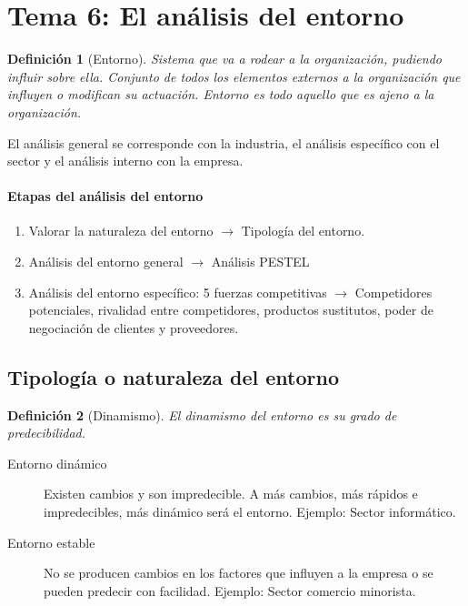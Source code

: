 \documentclass[12pt]{article}
\theoremstyle{definition_wo_parentheses}
\newtheorem{definicion}{Definición}[section]
\begin{document}
\section{Tema 6: El análisis del entorno}

\begin{definicion}[Entorno] 
	Sistema que va a rodear a la organización, pudiendo influir sobre ella. Conjunto de todos los elementos externos a la organización que influyen o modifican su actuación. Entorno es todo aquello que es ajeno a la organización.
\end{definicion}

	El análisis general se corresponde con la industria, el análisis específico con el sector y el análisis interno con la empresa.
	
\paragraph{Etapas del análisis del entorno}
\begin{enumerate}
\item Valorar la naturaleza del entorno $\rightarrow$ Tipología del entorno.
\item Análisis del entorno general $\rightarrow$ Análisis PESTEL
\item Análisis del entorno específico: 5 fuerzas competitivas $\rightarrow$ Competidores potenciales, rivalidad entre competidores, productos sustitutos, poder de negociación de clientes y proveedores.
\end{enumerate}

\subsection{Tipología  o naturaleza del entorno}

\begin{definicion}[Dinamismo]
El dinamismo del entorno es su grado de predecibilidad.
\end{definicion}

\begin{description}
\item[Entorno dinámico] Existen cambios y son impredecible. A más cambios, más rápidos e impredecibles, más dinámico será el entorno. Ejemplo: Sector informático.
\item[Entorno estable] No se producen cambios en los factores que influyen a la empresa o se pueden predecir con facilidad. Ejemplo: Sector comercio minorista.
\end{description}
\end{document}

